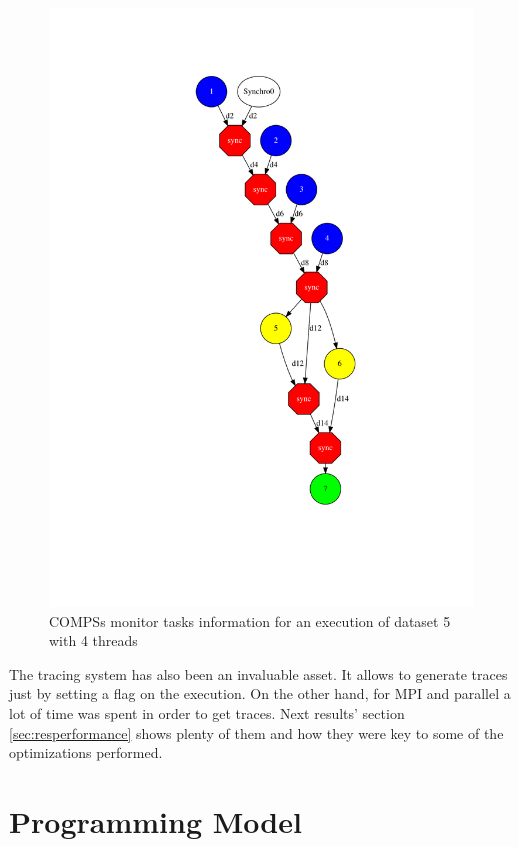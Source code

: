  \begin{figure}[h]
 \includegraphics[height=\textheight]{img/main_01_completeGraph.png}
 \caption{COMPSs monitor tasks information for an execution of dataset 5 with 4 threads}
 \label{fig:monitor}
 \end{figure}
 
 
 The tracing system has also been an invaluable asset. It allows to generate traces just by setting a flag on the execution. On the other hand, for MPI and parallel a lot of time was spent in order to get traces. Next results' section \ref{sec:resperformance} shows plenty of them and how they were key to some of the optimizations performed.

\section{Programming Model}

